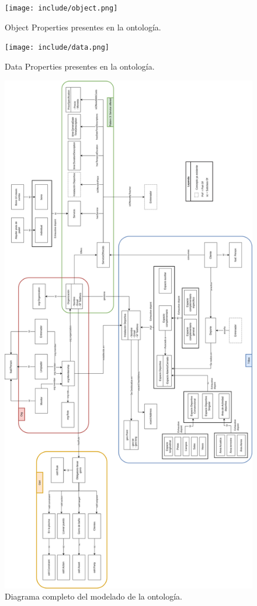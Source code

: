 \documentclass[a4paper,12pt]{article}
\begin{document}
	\begin{figure}[H]
		\centering
		\texttt{[image: include/object.png]}
		\caption{Object Properties presentes en la ontología.}
	\end{figure}
	
	\begin{figure}[H]
		\centering
		\texttt{[image: include/data.png]}
		\caption{Data Properties presentes en la ontología.}
	\end{figure}
	
		\begin{figure}[H]
		\centering
		\includegraphics[height=0.99\textheight]{include/diagrama_modelo_completo.png}
		\caption{Diagrama completo del modelado de la ontología.}
	\end{figure}
	
\end{document}
